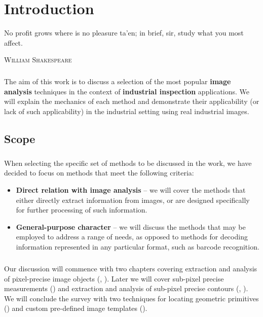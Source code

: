 \chapter*{Introduction}

\epigraph{No profit grows where is no pleasure ta'en; in brief, sir, study what you most affect.}
{\textsc{William Shakespeare}}


\pagebreak


\paragraph*{}
The aim of this work is to discuss a selection of the most popular \textbf{image analysis} techniques in the context of \textbf{industrial inspection} applications. We will explain the mechanics of each method and demonstrate their applicability (or lack of such applicability) in the industrial setting using real industrial images.

\section*{Scope}

\paragraph*{}
When selecting the specific set of methods to be discussed in the work, we have decided to focus on methods that meet the following criteria:
\begin{itemize}
	\item \textbf{Direct relation with image analysis} -- we will cover the methods that either directly extract information from images, or are designed specifically for further processing of such information.
	\item \textbf{General-purpose character} -- we will discuss the methods that may be employed to address a range of needs, as opposed to methods for decoding information represented in any particular format, such as barcode recognition.
\end{itemize}

\paragraph*{}
Our discussion will commence with two chapters covering extraction and analysis of pixel-precise image objects (, ). Later we will cover sub-pixel precise measurements () and extraction and analysis of sub-pixel precise contours (, ). We will conclude the survey with two techniques for locating geometric primitives () and custom pre-defined image templates ().

